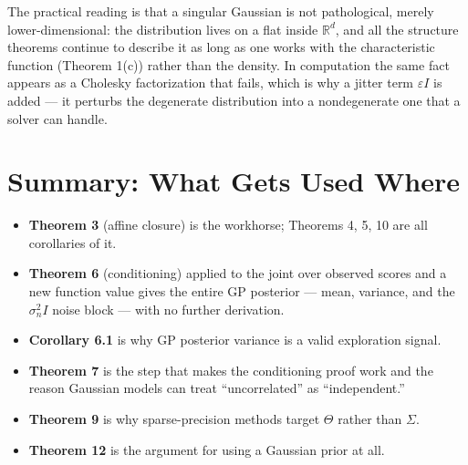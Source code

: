 \documentclass[conference]{IEEEtran}
\begin{document}
\medskip
The practical reading is that a singular Gaussian is not pathological, merely lower-dimensional: the distribution lives on a flat inside $\mathbb{R}^d$, and all the structure theorems continue to describe it as long as one works with the characteristic function (Theorem 1(c)) rather than the density. In computation the same fact appears as a Cholesky factorization that fails, which is why a jitter term $\varepsilon I$ is added --- it perturbs the degenerate distribution into a nondegenerate one that a solver can handle.

\section*{Summary: What Gets Used Where}
\begin{itemize}
    \item \textbf{Theorem 3} (affine closure) is the workhorse; Theorems 4, 5, 10 are all corollaries of it.
    \item \textbf{Theorem 6} (conditioning) applied to the joint over observed scores and a new function value gives the entire GP posterior --- mean, variance, and the $\sigma_n^2 I$ noise block --- with no further derivation.
    \item \textbf{Corollary 6.1} is why GP posterior variance is a valid exploration signal.
    \item \textbf{Theorem 7} is the step that makes the conditioning proof work and the reason Gaussian models can treat ``uncorrelated'' as ``independent.''
    \item \textbf{Theorem 9} is why sparse-precision methods target $\Theta$ rather than $\Sigma$.
    \item \textbf{Theorem 12} is the argument for using a Gaussian prior at all.
\end{itemize}
\end{document}
